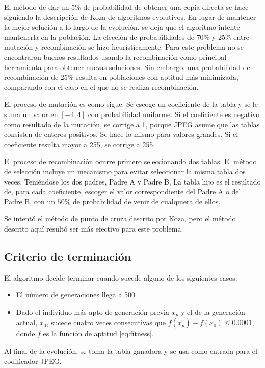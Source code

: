El método de dar un 5\% de probabilidad de obtener una copia directa se hace
siguiendo la descripción de Koza de algoritmos evolutivos. En lugar de mantener
la mejor solución a lo largo de la evolución, se deja que el algoritmo intente
mantenerla en la población. La elección de probabilidades de 70\% y 25\% entre
mutación y recombinación se hizo heurísticamente. Para este problema no se
encontraron buenos resultados usando la recombinación como principal
herramienta para obtener nuevas soluciones. Sin embargo, una probabilidad de
recombinación de 25\% resulta en poblaciones con aptitud más minimizada,
comparando con el caso en el que no se realiza recombinación.

El proceso de mutación es como sigue: Se escoge un coeficiente de la tabla y se
le suma un valor en $[-4, 4]$ con probabilidad uniforme. Si el coeficiente es
negativo como resultado de la mutación, se corrige a 1, porque JPEG asume que
las tablas consisten de enteros positivos. Se hace lo mismo para valores
grandes. Si el coeficiente resulta mayor a 255, se corrige a 255.

El proceso de recombinación ocurre primero seleccionando dos tablas. El método
de selección incluye un mecanismo para evitar seleccionar la misma tabla dos
veces. Teniéndose los dos padres, Padre A y Padre B, La tabla hijo es el
resultado de, para cada coeficiente, escoger el valor correspondiente del Padre
A o del Padre B, con un $50\%$ de probabilidad de venir de cualquiera de ellos.

Se intentó el método de punto de cruza descrito por Koza, pero el método
descrito aquí resultó ser más efectivo para este problema.

\subsection { Criterio de terminación }

El algoritmo decide terminar cuando sucede alguno de los siguientes casos:

\begin{itemize}
\item El número de generaciones llega a 500
\item Dado el individuo más apto de generación previa $x_p$ y el de la generación actual, $x_0$, sucede cuatro veces consecutivas que $f(x_p) - f(x_0) \leq 0.0001$, donde $f$ es la función de aptitud \ref{eq:fitness}.
\end{itemize}

Al final de la evolución, se toma la tabla ganadora y se usa como entrada para
el codificador \gls{JPEG}.

